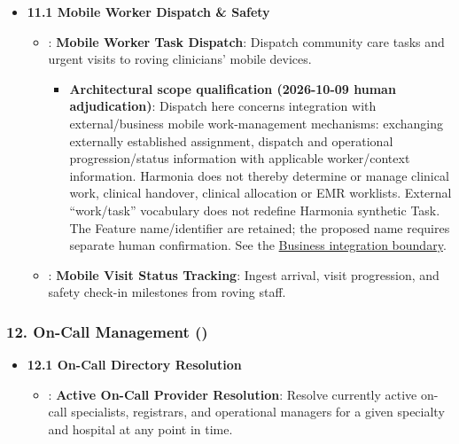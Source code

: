 \begin{itemize}

\item 
\textbf{11.1 Mobile Worker Dispatch \& Safety}


\begin{itemize}

\item 
\texttt{}: \textbf{Mobile Worker Task Dispatch}: Dispatch community care tasks and urgent visits to roving clinicians' mobile devices.


\begin{itemize}

\item 
\textbf{Architectural scope qualification (2026-10-09 human adjudication)}: Dispatch here concerns integration with external/\allowbreak{}business mobile work-management mechanisms: exchanging externally established assignment, dispatch and operational progression/\allowbreak{}status information with applicable worker/\allowbreak{}context information. Harmonia does not thereby determine or manage clinical work, clinical handover, clinical allocation or EMR worklists. External “work/\allowbreak{}task” vocabulary does not redefine Harmonia synthetic Task. The Feature name/\allowbreak{}identifier are retained; the proposed name \texttt{} requires separate human confirmation. See the \hyperref[rad:metamodel:173]{Business integration boundary}.



\end{itemize}


\item 
\texttt{}: \textbf{Mobile Visit Status Tracking}: Ingest arrival, visit progression, and safety check-in milestones from roving staff.



\end{itemize}


\end{itemize}
\label{rad:enabling:526}
\subsubsection*{12. On-Call Management (\texttt{})}
\label{rad:enabling:527}

\begin{itemize}

\item 
\textbf{12.1 On-Call Directory Resolution}


\begin{itemize}

\item 
\texttt{}: \textbf{Active On-Call Provider Resolution}: Resolve currently active on-call specialists, registrars, and operational managers for a given specialty and hospital at any point in time.



\end{itemize}


\end{itemize}
\label{rad:enabling:530}
